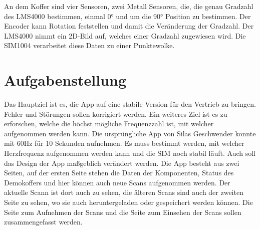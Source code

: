 An dem Koffer sind vier Sensoren, zwei Metall Sensoren, die, die genau Gradzahl des LMS4000 bestimmen, einmal 0° und um die 90° Position zu bestimmen. Der Encoder kann Rotation feststellen und damit die Veränderung der Gradzahl.
Der LMS4000 nimmt ein 2D-Bild auf, welches einer Gradzahl zugewiesen wird. Die SIM1004 verarbeitet diese Daten zu einer Punktewolke.

\section{Aufgabenstellung}
Das Hauptziel ist es, die App auf eine stabile Version für den Vertrieb zu bringen. Fehler und Störungen sollen korrigiert werden. Ein weiteres Ziel ist es zu erforschen, welche die höchst mögliche Frequenzzahl ist, mit welcher aufgenommen werden kann. Die ursprüngliche App von Silas Geschwender konnte mit 60Hz für 10 Sekunden aufnehmen. Es muss bestimmt werden, mit welcher Herzfrequenz aufgenommen werden kann und die SIM noch stabil läuft. Auch soll das Design der App maßgeblich verändert werden. Die App besteht aus zwei Seiten, auf der ersten Seite stehen die Daten der Komponenten, Status des Demokoffers und hier können auch neue Scans aufgenommen werden. Der aktuelle Scann ist dort auch zu sehen, die älteren Scans sind auch der zweiten Seite zu sehen, wo sie auch heruntergeladen oder gespeichert werden können. Die Seite zum Aufnehmen der Scans und die Seite zum Einsehen der Scans sollen zusammengefasst werden.
